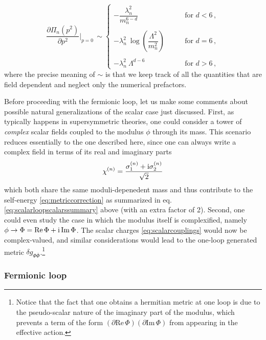%
\begin{equation}\label{eq:scalarloopscalarssummary}
		\frac {\partial \Pi_n(p^2)}{\partial p^2} \bigg\rvert_{p=0}\,   \sim 
		\left\{\begin{array}{lr}
			-  \dfrac{\lambda_n^2}{m_n^{6-d}} & \qquad\text{for } d< 6\, ,\\ \\ 
			-\lambda_n^2 \ \log \left( \dfrac{\Lambda^2}{m_n^2}\right) &\qquad \text{for } d= 6\, ,\\ \\ 
			-\lambda_n^2 \ \Lambda^{d-6}&\qquad \text{for } d>6\, ,
		\end{array}\right.
\end{equation}
%
where the precise meaning of $\sim$ is that we keep track of all the quantities that are field dependent and neglect only the numerical prefactors. %
	
Before proceeding with the fermionic loop, let us make some comments about possible natural generalizations of the scalar case just discussed. First, as typically happens in supersymmetric theories, one could consider a tower of \emph{complex} scalar fields coupled to the modulus $\phi$ through its mass. This scenario reduces essentially to the one described here, since one can always write a complex field in terms of its real and imaginary parts
%
\begin{align}
    \chi^{(n)}=\frac{\sigma^{(n)}_1+\text{i}\sigma^{(n)}_2}{\sqrt{2}}
\end{align}
%
which both share the same moduli-depenedent mass and thus contribute to the self-energy \eqref{eq:metriccorrection} as summarized in eq. \eqref{eq:scalarloopscalarssummary} above (with an extra factor of 2). Second, one could even study the case in which the modulus itself is complexified, namely $\phi \to \Phi = \text{Re}\, \Phi + \text{i}\, \text{Im}\, \Phi$. The scalar charges \eqref{eq:scalarcouplings} would now be complex-valued, and similar considerations would lead to the one-loop generated metric $\delta g_{\Phi \bar \Phi}$.\footnote{Notice that the fact that one obtains a hermitian metric at one loop is due to the pseudo-scalar nature of the imaginary part of the modulus, which prevents a term of the form $(\partial \text{Re}\, \Phi)(\partial \text{Im}\, \Phi)$ from appearing in the effective action.}
	
	
\subsubsection*{Fermionic loop}
	

